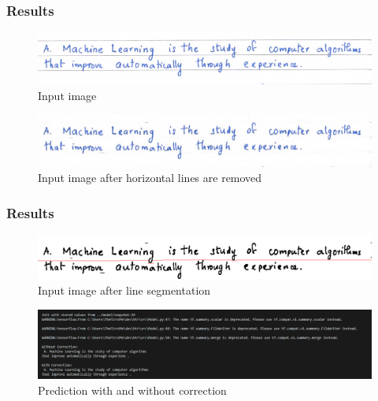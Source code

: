 \begin{frame}
    \frametitle{Results}
    \begin{figure}[!htb]
        \centering
        \includegraphics[scale=0.3]{images/1.png}
        \caption{Input image}
        \label{inp1}
    \end{figure}

    \begin{figure}[!htb]
        \centering
        \includegraphics[scale=0.3]{images/2.png}
        \caption{Input image after horizontal lines are removed}
        \label{inp2}
    \end{figure}
\end{frame}
\begin{frame}
    \frametitle{Results}
    \begin{figure}[!htb]
        \centering
        \includegraphics[scale=0.3]{images/3.png}
        \caption{Input image after line segmentation}
        \label{inp3}
    \end{figure}

    \begin{figure}[!htb]
        \centering
        \includegraphics[scale=0.35]{images/predict.png}
        \caption{Prediction with and without correction}
        \label{predict}
    \end{figure}
\end{frame}

